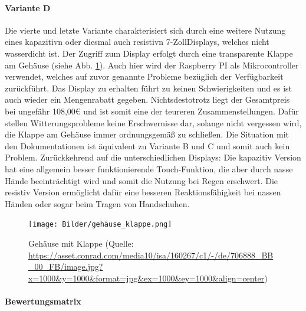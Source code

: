 \paragraph{Variante D}
Die vierte und letzte Variante charakterisiert sich durch eine weitere Nutzung eines \gls{kapazitiv}n oder diesmal auch \gls{resistiv}n 7-ZollDisplays, welches nicht wasserdicht ist. Der Zugriff zum Display erfolgt durch eine transparente Klappe am Gehäuse (siehe Abb.  \ref{fig:gehäuse_mit_klappe}). Auch hier wird der Raspberry PI als Mikrocontroller verwendet, welches auf zuvor genannte Probleme bezüglich der Verfügbarkeit zurückführt. Das Display zu erhalten führt zu keinen Schwierigkeiten und es ist auch wieder ein Mengenrabatt gegeben. Nichtsdestotrotz liegt der Gesamtpreis bei ungefähr 108,00€ und ist somit eine der teureren Zusammenstellungen. Dafür stellen Witterungsprobleme keine Erschwernisse dar, solange nicht vergessen wird, die Klappe am Gehäuse immer ordnungsgemäß zu schließen. Die Situation mit den Dokumentationen ist äquivalent zu Variante B und C und somit auch kein Problem. Zurückkehrend auf die unterschiedlichen Displays: Die \gls{kapazitiv} Version hat eine allgemein besser funktionierende Touch-Funktion, die aber durch nasse Hände beeinträchtigt wird und somit die Nutzung bei Regen erschwert. Die \gls{resistiv} Version ermöglicht dafür eine besseren Reaktionsfähigkeit bei nassen Händen oder sogar beim Tragen von Handschuhen.
\begin{figure}[ht]
	\centering
	\texttt{[image: Bilder/gehäuse\_klappe.png]}
	\caption{Gehäuse mit Klappe (Quelle: \url{https://asset.conrad.com/media10/isa/160267/c1/-/de/706888_BB_00_FB/image.jpg?x=1000&y=1000&format=jpg&ex=1000&ey=1000&align=center})}
	\label{fig:gehäuse_mit_klappe}
\end{figure}
\newpage
\paragraph{Bewertungsmatrix}

